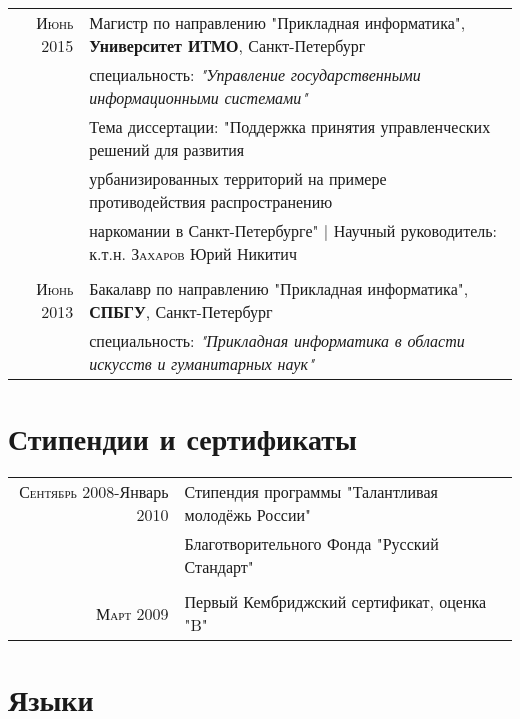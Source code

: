 \documentclass[a4paper,10pt]{article} %
\begin{document}
\begin{tabular}{rl}	
    \textsc{Июнь} 2015 & Магистр по направлению "Прикладная информатика",
        \textbf{Университет ИТМО}, Санкт-Петербург\\
        & специальность: \small\emph{"Управление государственными информационными
            системами"}
\medskip
\\
& Тема диссертации: "Поддержка принятия управленческих решений для развития
\\&
урбанизированных территорий на примере противодействия распространению
\\&
наркомании в Санкт-Петербурге" | \small Научный руководитель:  к.т.н.
\textsc{Захаров} Юрий
Никитич \\

\multicolumn{2}{c}{} \\

\textsc{Июнь} 2013 & Бакалавр по направлению "Прикладная информатика",
\textbf{СПБГУ}, Санкт-Петербург\\
& специальность: \small\emph{"Прикладная информатика в области искусств и
    гуманитарных наук"}
\end{tabular}


\section{Стипендии и сертификаты}

\begin{tabular}{rl}
    \textsc{Сентябрь} 2008-Январь 2010& Стипендия программы "Талантливая
    молодёжь России" \\&Благотворительного Фонда "Русский Стандарт"\\
\multicolumn{2}{c}{} \\
    \textsc{Март} 2009& Первый Кембриджский сертификат, оценка "B"
\\
\end{tabular}


\section{Языки}
\end{document}
